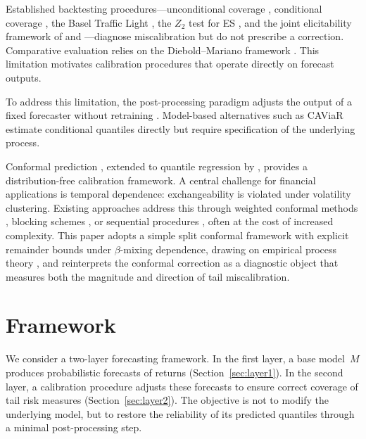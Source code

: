 \documentclass[preprint,11pt,authoryear]{elsarticle}
\newcommand{\1}{\boldsymbol{1}}
\begin{document}
	Established backtesting procedures---unconditional coverage
	\citep{kupiec1995}, conditional coverage
	\citep{christoffersen1998}, the Basel Traffic Light
	\citep{basel1996}, the $Z_2$ test for ES
	\citep{acerbi2014back}, and the joint elicitability framework
	of \citet{fissler2016higher} and
	\citet{nolde2017elicitability}---diagnose miscalibration but
	do not prescribe a correction. Comparative evaluation relies
	on the Diebold--Mariano framework
	\citep{diebold1995comparing,harvey1997testing}. This
	limitation motivates calibration procedures that operate
	directly on forecast outputs.
	
	To address this limitation, the post-processing paradigm adjusts
	the output of a fixed forecaster without retraining
	\citep{gneiting2013combining, brehmer2021properification,
		taillardat2016calibrated}. Model-based
	alternatives such as CAViaR \citep{engle2004caviar} estimate
	conditional quantiles directly but require specification of
	the underlying process.
	
	Conformal prediction \citep{vovk2005algorithmic}, extended to
	quantile regression by \citet{romano2019conformalized},
	provides a distribution-free calibration framework. A central
	challenge for financial applications is temporal dependence:
	exchangeability is violated under volatility clustering.
	Existing approaches address this through weighted conformal
	methods \citep{barber2023conformal}, blocking schemes
	\citep{chernozhukov2018exact}, or sequential procedures
	\citep{gibbs2021adaptive, zaffran2022conformal,
		xu2024conformal}, often at the cost of increased complexity.
	This paper adopts a simple split conformal framework with
	explicit remainder bounds under $\beta$-mixing dependence,
	drawing on empirical process theory
	\citep{rio2017asymptotic, yu1994rates}, and reinterprets the
	conformal correction as a diagnostic object that measures both
	the magnitude and direction of tail miscalibration.
	
	
	
	\section{Framework}
	\label{sec:framework}
	
	We consider a two-layer forecasting framework.
	In the first layer, a base model~$M$ produces
	probabilistic forecasts of returns
	(Section~\ref{sec:layer1}).
	In the second layer, a calibration procedure adjusts
	these forecasts to ensure correct coverage of tail
	risk measures (Section~\ref{sec:layer2}).
	The objective is not to modify the
	underlying model, but to restore the reliability of
	its predicted quantiles through a minimal
	post-processing step.
	
\end{document}
